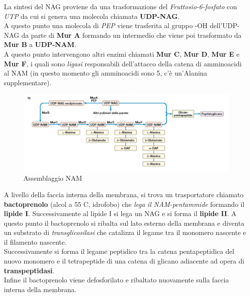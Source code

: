 \documentclass[11pt]{book}
\begin{document}
La sintesi del NAG proviene da una trasformazione del \emph{Fruttosio-6-fosfato} con \emph{UTP} da cui si genera una molecola chiamata \textbf{UDP-NAG}.\\
A questo punto una molecola di \emph{PEP} viene trasferita al gruppo -OH dell’UDP-NAG da parte di \textbf{Mur A} formando un intermedio che viene poi trasformato da \textbf{Mur B} a \textbf{UDP-NAM}. \\
A questo punto intervengono altri enzimi chiamati \textbf{Mur C}, \textbf{Mur D}, \textbf{Mur E} e \textbf{Mur F}, i quali sono \emph{ligasi} responsabili dell’attacco della catena di amminoacidi al NAM (in questo momento gli amminoacidi sono 5, c’è un’Alanina supplementare).

\begin{figure}[htp]
\centering
\includegraphics[scale=0.45]{img/Assemblaggio NAM.png}
\caption{Assemblaggio NAM}
\label{}
\end{figure}

A livello della faccia interna della membrana, si trova un trasportatore chiamato \textbf{bactoprenolo} (alcol a 55 C, idrofobo) che \emph{lega il NAM-pentammide} formando il \textbf{lipide I}. Successivamente al lipide I si lega un NAG e si forma il \textbf{lipide II}. A questo punto il bactoprenolo si ribalta sul lato esterno della membrana e diventa un substrato di \emph{transglicosilasi} che catalizza il legame tra il monomero nascente e il filamento nascente.\\
Successivamente si forma il legame peptidico tra la catena pentapeptidica del nuovo monomero e il tetrapeptide di una catena di glicano adiacente ad opera di \textbf{transpeptidasi}. \\
Infine il bactoprenolo viene defosforilato e ribaltato nuovamente sulla faccia interna della membrana.
\end{document}
